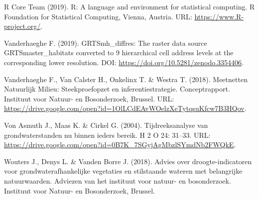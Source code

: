 \documentclass[11pt,]{book}
\begin{document}
\hypertarget{ref-citingR}{}
R Core Team (2019). R: A language and environment for statistical
computing. R Foundation for Statistical Computing, Vienna, Austria. URL:
\url{https://www.R-project.org/}.

\hypertarget{ref-vanderhaeghe_grtsmh_diffres_2019}{}
Vanderhaeghe F. (2019). GRTSmh\_diffres: The raster data source
GRTSmaster\_habitats converted to 9 hierarchical cell address levels at
the corresponding lower resolution. DOI:
\url{https://doi.org/10.5281/zenodo.3354406}.

\hypertarget{ref-vanderhaeghe_meetnetten_2018}{}
Vanderhaeghe F., Van Calster H., Onkelinx T. \& Westra T. (2018).
Meetnetten Natuurlijk Milieu: Steekproefopzet en inferentiestrategie.
Conceptrapport. Instituut voor Natuur- en Bosonderzoek, Brussel. URL:
\url{https://drive.google.com/open?id=1OlLCdEAvWOelzXeTytqsuKfcw7B3HQov}.

\hypertarget{ref-RN877}{}
Von Asmuth J., Maas K. \& Cirkel G. (2004). Tijdreeksanalyse van
grondwaterstanden nu binnen ieders bereik. H 2 O 24: 31--33. URL:
\url{https://drive.google.com/open?id=0B7K_7SGyjAgMbzlSYmdNb2FWQkE}.

\hypertarget{ref-RN5703}{}
Wouters J., Denys L. \& Vanden Borre J. (2018). Advies over
droogte-indicatoren voor grondwaterafhankelijke vegetaties en
stilstaande wateren met belangrijke natuurwaarden. Adviezen van het
instituut voor natuur- en bosonderzoek. Instituut voor Natuur- en
Bosonderzoek, Brussel.
\end{document}

